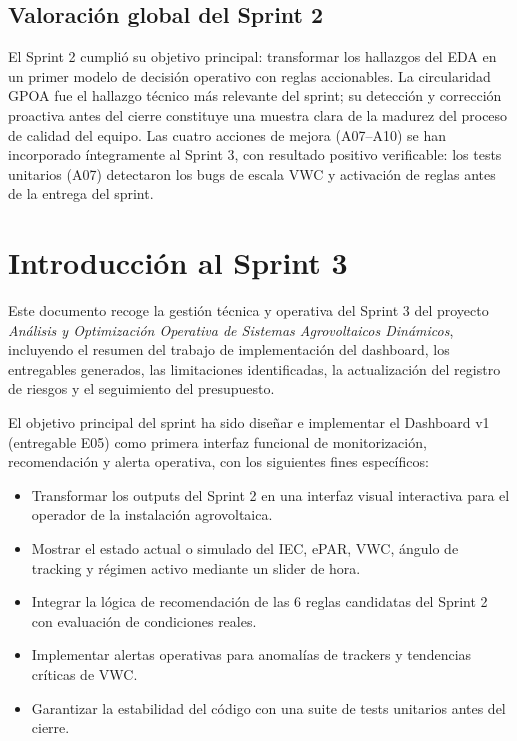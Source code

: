 \documentclass[11pt,a4paper]{article}
\begin{document}
\subsection{Valoración global del Sprint 2}

El Sprint 2 cumplió su objetivo principal: transformar los hallazgos del EDA en un primer
modelo de decisión operativo con reglas accionables. La circularidad GPOA fue el hallazgo
técnico más relevante del sprint; su detección y corrección proactiva antes del cierre
constituye una muestra clara de la madurez del proceso de calidad del equipo. Las cuatro
acciones de mejora (A07–A10) se han incorporado íntegramente al Sprint 3, con resultado
positivo verificable: los tests unitarios (A07) detectaron los bugs de escala VWC y
activación de reglas antes de la entrega del sprint.

\section{Introducción al Sprint 3}

Este documento recoge la gestión técnica y operativa del Sprint 3 del proyecto \textit{Análisis y
Optimización Operativa de Sistemas Agrovoltaicos Dinámicos}, incluyendo el resumen del
trabajo de implementación del dashboard, los entregables generados, las limitaciones
identificadas, la actualización del registro de riesgos y el seguimiento del presupuesto.

El objetivo principal del sprint ha sido diseñar e implementar el Dashboard v1 (entregable
E05) como primera interfaz funcional de monitorización, recomendación y alerta operativa,
con los siguientes fines específicos:

\begin{itemize}
  \item Transformar los outputs del Sprint 2 en una interfaz visual interactiva para el operador
    de la instalación agrovoltaica.
  \item Mostrar el estado actual o simulado del IEC, ePAR, VWC, ángulo de tracking y régimen
    activo mediante un slider de hora.
  \item Integrar la lógica de recomendación de las 6 reglas candidatas del Sprint 2 con
    evaluación de condiciones reales.
  \item Implementar alertas operativas para anomalías de trackers y tendencias críticas de VWC.
  \item Garantizar la estabilidad del código con una suite de tests unitarios antes del cierre.
\end{itemize}
\end{document}
